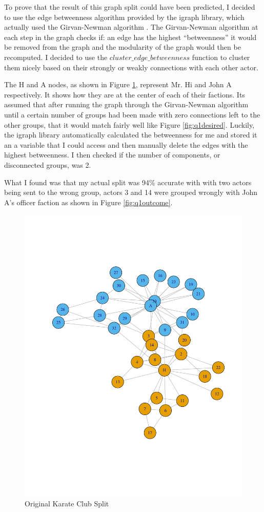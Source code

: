 \documentclass[letterpaper,11pt]{article}
\begin{document}
To prove that the result of this graph split could have been predicted, I decided to use the edge betweenness algorithm provided by the igraph library, which actually used the Girvan-Newman algorithm \cite{commref}. The Girvan-Newman algorithm at each step in the graph checks if: an edge has the highest ``betweenness'' it would be removed from the graph and the modularity of the graph would then be recomputed. I decided to use the $cluster\_edge\_betweenness$ function to cluster them nicely based on their strongly or weakly connections with each other actor.

The H and A nodes, as shown in Figure \ref{fig:q1orig}, represent Mr. Hi and John A respectively. It shows how they are at the center of each of their factions. Its assumed that after running the graph through the Girvan-Newman algorithm until a certain number of groups had been made with zero connections left to the other groups, that it would match fairly well like Figure \ref{fig:q1desired}. Luckily, the igraph library automatically calculated the betweenness for me and stored it an a variable that I could access and then manually delete the edges with the highest betweenness. I then checked if the number of components, or disconnected groups, was 2. 

What I found was that my actual split was 94\% accurate with with two actors being sent to the wrong group, actors 3 and 14 were grouped wrongly with John A's officer faction as shown in Figure \ref{fig:q1outcome}.

\begin{figure}[h]
\centering
\includegraphics[scale=0.6]{originalSplit.pdf}
\caption{Original Karate Club Split}
\label{fig:q1orig}
\end{figure}
\end{document}
